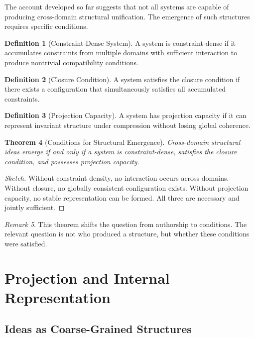 \documentclass[11pt]{article}
\theoremstyle{plain}
\newtheorem{theorem}{Theorem}[section]
\theoremstyle{definition}
\newtheorem{definition}[theorem]{Definition}
\theoremstyle{remark}
\newtheorem{remark}[theorem]{Remark}
\begin{document}
The account developed so far suggests that not all systems are capable
of producing cross-domain structural unification. The emergence of such
structures requires specific conditions.

\begin{definition}[Constraint-Dense System]
A system is constraint-dense if it accumulates constraints from multiple
domains with sufficient interaction to produce nontrivial compatibility
conditions.
\end{definition}

\begin{definition}[Closure Condition]
A system satisfies the closure condition if there exists a configuration
that simultaneously satisfies all accumulated constraints.
\end{definition}

\begin{definition}[Projection Capacity]
A system has projection capacity if it can represent invariant structure
under compression without losing global coherence.
\end{definition}

\begin{theorem}[Conditions for Structural Emergence]
Cross-domain structural ideas emerge if and only if a system is
constraint-dense, satisfies the closure condition, and possesses
projection capacity.
\end{theorem}

\begin{proof}[Sketch]
Without constraint density, no interaction occurs across domains.
Without closure, no globally consistent configuration exists.
Without projection capacity, no stable representation can be formed.
All three are necessary and jointly sufficient.
\end{proof}

\begin{remark}
This theorem shifts the question from authorship to conditions. The
relevant question is not who produced a structure, but whether these
conditions were satisfied.
\end{remark}

\section{Projection and Internal Representation}

\subsection{Ideas as Coarse-Grained Structures}
\end{document}
